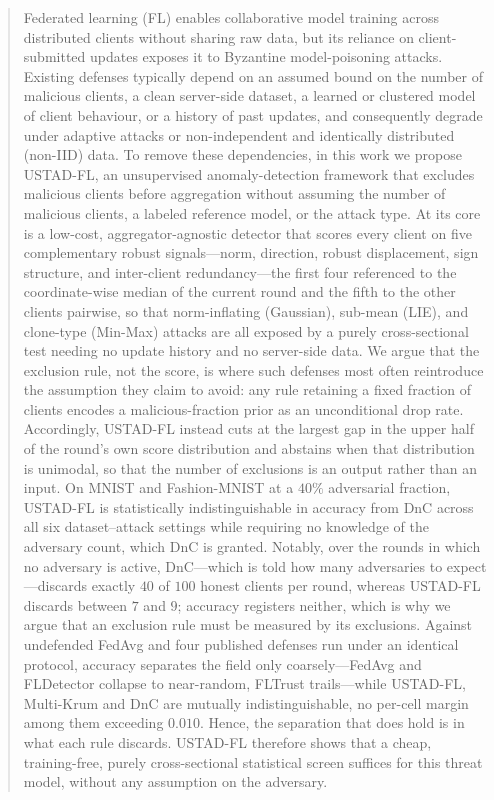 \documentclass[journal]{IEEEtran}
\begin{document}
\begin{abstract}
Federated learning (FL) enables collaborative model training across distributed clients without sharing raw data, but its reliance on client-submitted updates exposes it to Byzantine model-poisoning attacks. Existing defenses typically depend on an assumed bound on the number of malicious clients, a clean server-side dataset, a learned or clustered model of client behaviour, or a history of past updates, and consequently degrade under adaptive attacks or non-independent and identically distributed (non-IID) data. To remove these dependencies, in this work we propose USTAD-FL, an unsupervised anomaly-detection framework that excludes malicious clients before aggregation without assuming the number of malicious clients, a labeled reference model, or the attack type. At its core is a low-cost, aggregator-agnostic detector that scores every client on five complementary robust signals---norm, direction, robust displacement, sign structure, and inter-client redundancy---the first four referenced to the coordinate-wise median of the current round and the fifth to the other clients pairwise, so that norm-inflating (Gaussian), sub-mean (LIE), and clone-type (Min-Max) attacks are all exposed by a purely cross-sectional test needing no update history and no server-side data. We argue that the exclusion rule, not the score, is where such defenses most often reintroduce the assumption they claim to avoid: any rule retaining a fixed fraction of clients encodes a malicious-fraction prior as an unconditional drop rate. Accordingly, USTAD-FL instead cuts at the largest gap in the upper half of the round's own score distribution and abstains when that distribution is unimodal, so that the number of exclusions is an output rather than an input. On MNIST and Fashion-MNIST at a $40\%$ adversarial fraction, USTAD-FL is statistically indistinguishable in accuracy from DnC across all six dataset--attack settings while requiring no knowledge of the adversary count, which DnC is granted. Notably, over the rounds in which no adversary is active, DnC---which is told how many adversaries to expect---discards exactly $40$ of $100$ honest clients per round, whereas USTAD-FL discards between $7$ and $9$; accuracy registers neither, which is why we argue that an exclusion rule must be measured by its exclusions. Against undefended FedAvg and four published defenses run under an identical protocol, accuracy separates the field only coarsely---FedAvg and FLDetector collapse to near-random, FLTrust trails---while USTAD-FL, Multi-Krum and DnC are mutually indistinguishable, no per-cell margin among them exceeding $0.010$. Hence, the separation that does hold is in what each rule discards. USTAD-FL therefore shows that a cheap, training-free, purely cross-sectional statistical screen suffices for this threat model, without any assumption on the adversary.
\end{abstract}
\end{document}
